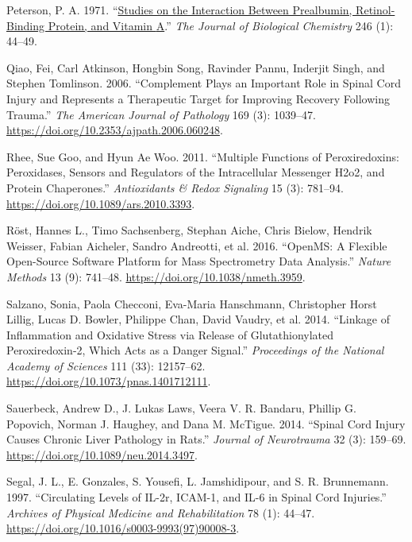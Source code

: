 \documentclass[
]{article}
\newlength{\cslhangindent}
\newlength{\cslentryspacingunit} %
\newenvironment{CSLReferences}[2] %
 {%
  \setlength{\parindent}{0pt}
  \ifodd #1
  \let\oldpar\par
  \def\par{\hangindent=\cslhangindent\oldpar}
  \fi
  \setlength{\parskip}{#2\cslentryspacingunit}
 }%
 {}
\begin{document}
\begin{landscape}
\begin{landscape}
\begin{CSLReferences}{1}{0}
\leavevmode{}%
Peterson, P. A. 1971. {``\href{https://www.ncbi.nlm.nih.gov/pubmed/5541771}{Studies on the Interaction Between Prealbumin, Retinol-Binding Protein, and Vitamin {A}}.''} \emph{The Journal of Biological Chemistry} 246 (1): 44--49.

\leavevmode{}%
Qiao, Fei, Carl Atkinson, Hongbin Song, Ravinder Pannu, Inderjit Singh, and Stephen Tomlinson. 2006. {``Complement {Plays} an {Important Role} in {Spinal Cord Injury} and {Represents} a {Therapeutic Target} for {Improving Recovery} Following {Trauma}.''} \emph{The American Journal of Pathology} 169 (3): 1039--47. \url{https://doi.org/10.2353/ajpath.2006.060248}.

\leavevmode{}%
Rhee, Sue Goo, and Hyun Ae Woo. 2011. {``Multiple {Functions} of {Peroxiredoxins}: {Peroxidases}, {Sensors} and {Regulators} of the {Intracellular Messenger H2o2}, and {Protein Chaperones}.''} \emph{Antioxidants \& Redox Signaling} 15 (3): 781--94. \url{https://doi.org/10.1089/ars.2010.3393}.

\leavevmode{}%
Röst, Hannes L., Timo Sachsenberg, Stephan Aiche, Chris Bielow, Hendrik Weisser, Fabian Aicheler, Sandro Andreotti, et al. 2016. {``{OpenMS}: A Flexible Open-Source Software Platform for Mass Spectrometry Data Analysis.''} \emph{Nature Methods} 13 (9): 741--48. \url{https://doi.org/10.1038/nmeth.3959}.

\leavevmode{}%
Salzano, Sonia, Paola Checconi, Eva-Maria Hanschmann, Christopher Horst Lillig, Lucas D. Bowler, Philippe Chan, David Vaudry, et al. 2014. {``Linkage of Inflammation and Oxidative Stress via Release of Glutathionylated Peroxiredoxin-2, Which Acts as a Danger Signal.''} \emph{Proceedings of the National Academy of Sciences} 111 (33): 12157--62. \url{https://doi.org/10.1073/pnas.1401712111}.

\leavevmode{}%
Sauerbeck, Andrew D., J. Lukas Laws, Veera V. R. Bandaru, Phillip G. Popovich, Norman J. Haughey, and Dana M. McTigue. 2014. {``Spinal {Cord Injury Causes Chronic Liver Pathology} in {Rats}.''} \emph{Journal of Neurotrauma} 32 (3): 159--69. \url{https://doi.org/10.1089/neu.2014.3497}.

\leavevmode{}%
Segal, J. L., E. Gonzales, S. Yousefi, L. Jamshidipour, and S. R. Brunnemann. 1997. {``Circulating Levels of {IL-2r}, {ICAM-1}, and {IL-6} in Spinal Cord Injuries.''} \emph{Archives of Physical Medicine and Rehabilitation} 78 (1): 44--47. \url{https://doi.org/10.1016/s0003-9993(97)90008-3}.


\end{CSLReferences}
\end{landscape}
\end{landscape}
\end{document}
